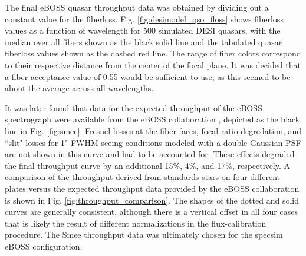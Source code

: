 The final eBOSS quasar throughput data was obtained by dividing out a constant value for the fiberloss. Fig. \ref{fig:desimodel_qso_floss} shows fiberloss values as a function of wavelength for 500 simulated DESI quasars, with the median over all fibers shown as the black solid line and the tabulated quasar fiberloss values shown as the dashed red line. The range of fiber colors correspond to their respective distance from the center of the focal plane. It was decided that a fiber acceptance value of 0.55 would be sufficient to use, as this seemed to be about the average across all wavelengths.

It was later found that data for the expected throughput of the eBOSS spectrograph were available from the eBOSS collaboration \cite{Smee_2013}, depicted as the black line in Fig. \ref{fig:smee}. Fresnel losses at the fiber faces, focal ratio degredation, and ``slit" losses for 1" FWHM seeing conditions modeled with a double Gaussian PSF are not shown in this curve and had to be accounted for. These effects degraded the final throughput curve by an additional 15\%, 4\%, and 17\%, respectively. A comparison of the throughput derived from standards stars on four different plates versus the expected throughput data provided by the eBOSS collaboration is shown in Fig. \ref{fig:throughput_comparison}. The shapes of the dotted and solid curves are generally consistent, although there is a vertical offset in all four cases that is likely the result of different normalizations in the flux-calibration procedure. The Smee throughput data was ultimately chosen for the specsim eBOSS configuration.

